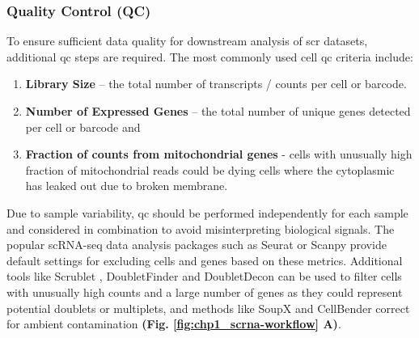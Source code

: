 \subsubsection{Quality Control (QC)}

\par To ensure sufficient data quality for downstream analysis of \gls{scr} datasets, additional \gls{qc} steps are required. The most commonly used cell \gls{qc} criteria include:
\begin{enumerate}
    \item \textbf{Library Size} – the total number of transcripts / counts per cell or barcode.
    \item \textbf{Number of Expressed Genes} – the total number of unique genes detected per cell or barcode and
    \item \textbf{Fraction of counts from mitochondrial genes } - cells with unusually high fraction of mitochondrial reads could be dying cells where the cytoplasmic  has leaked out due to broken membrane.
\end{enumerate}
\par Due to sample variability, \gls{qc} should be performed independently for each sample and considered in combination to avoid misinterpreting biological signals. The popular scRNA-seq data analysis packages such as Seurat \textbf{\cite{butler_integrating_2018,stuart_comprehensive_2019,hao_integrated_2021}} or Scanpy \textbf{\cite{wolf_scanpy_2018}} provide default settings for excluding cells and genes based on these metrics. Additional tools like Scrublet \textbf{\cite{wolock_scrublet_2019}}, DoubletFinder \textbf{\cite{mcginnis_doubletfinder_2019}} and DoubletDecon \textbf{\cite{depasquale_doubletdecon:_2019}} can be used to filter cells with unusually high counts and a large number of genes as they could represent potential doublets or multiplets, and methods like SoupX \textbf{\cite{young_soupx_2020}} and CellBender \textbf{\cite{fleming_unsupervised_2023}} correct for ambient  contamination \textbf{(Fig. \ref{fig:chp1_scrna-workflow} A)}.

